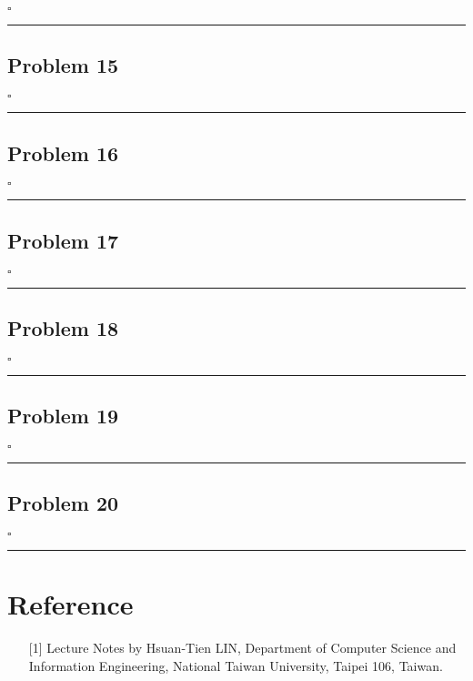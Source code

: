 \documentclass[12pt]{article}
\newcommand*{\QEDB}{\hfill\ensuremath{\square}}
\newcommand{\horrule}[1]{\rule{\linewidth}{#1}}
\begin{document}
\QEDB

\horrule{0.5pt}

\subsection*{Problem 15}

\QEDB

\horrule{0.5pt}

\subsection*{Problem 16}

\QEDB

\horrule{0.5pt}

\subsection*{Problem 17}

\QEDB

\horrule{0.5pt}

\subsection*{Problem 18}

\QEDB

\horrule{0.5pt}

\subsection*{Problem 19}

\QEDB

\horrule{0.5pt}

\subsection*{Problem 20}

\QEDB

\horrule{0.5pt}

\section*{Reference}

\begin{enumerate}

\item[{[1]}] Lecture Notes by Hsuan-Tien LIN, Department of Computer Science and Information Engineering, National Taiwan University, Taipei 106, Taiwan.

\end{enumerate}
\end{document}
